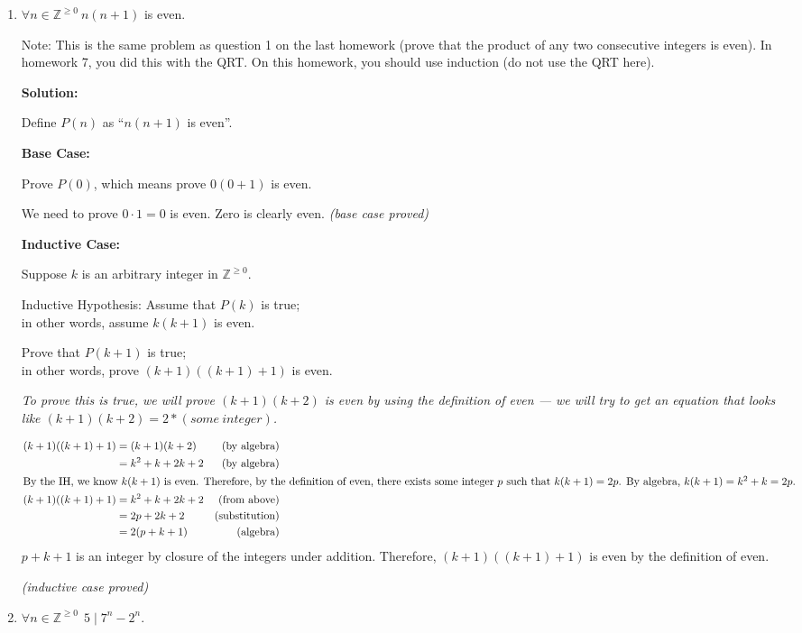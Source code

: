 \documentclass[11pt, letterpaper]{report}
\newcommand{\Z}{\mathbb{Z}}
\begin{document}
\begin{enumerate}
\item $\forall n \in \Z^{\geq 0} \ n(n+1)$ is even.

Note: This is the same problem as question 1 on the last homework (prove that the product of any two consecutive integers is even). 
In homework 7, you did this with the QRT.  On this homework, you should use induction (do not use the QRT here).


\textbf{Solution:}

Define $P(n)$ as ``$n(n+1)$ is even''.

\textbf{Base Case:}

Prove $P(0)$, which means prove $0(0+1)$ is even.

We need to prove $0\cdot 1 = 0$ is even.  Zero is clearly even.
 \textit{(base case proved)}

\textbf{Inductive Case:}

Suppose $k$ is an arbitrary integer in $ \Z^{\geq 0}$.

\medskip

Inductive Hypothesis: Assume that $P(k)$ is true; \\in other words, assume
$k(k+1)$ is even.

Prove that $P(k+1)$ is true; \\ \medskip in other words, prove
$(k+1)((k+1)+1)$ is even.

\textit{To prove this is true, we will prove $(k+1)(k+2)$ is even by using the definition of even --- we will try
to get an equation that looks like $(k+1)(k+2) = 2*(some\ integer)$.}

\begin{align*}
(k+1)((k+1)+1) &=(k+1)(k+2) & \text{(by algebra)}\\
&= k^2+k+2k+2 & \text{(by algebra)}\\
\intertext{By the IH, we know $k(k+1)$ is even.  Therefore, by the definition of even, there exists some integer $p$
such that $k(k+1)=2p$. By algebra, $k(k+1)=k^2+k=2p$.}
(k+1)((k+1)+1) &= k^2+k+2k+2 & \text{(from above)}\\
 &= 2p+2k+2 & \text{(substitution)}\\
  &= 2(p+k+1) & \text{(algebra)}
\end{align*}
$p+k+1$ is an integer by closure of the integers under addition.  Therefore, $(k+1)((k+1)+1)$  is even
by the definition of even.

\textit{(inductive case proved)}


\item $\forall n \in \Z^{\geq 0} \ \ 5 \mid 7^n - 2^n$.   


\end{enumerate}
\end{document}
